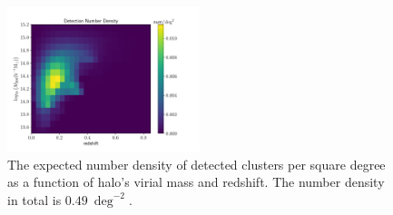 \begin{figure}
 \centering
 \includegraphics[width=0.5\textwidth]{detNum_zm.pdf}
 \caption{The expected number density of detected clusters per square degree as
     a function of halo's virial mass and redshift. The number density in total
     is $0.49~\deg^{-2}$.
     } \label{fig_detNum}
\end{figure}
